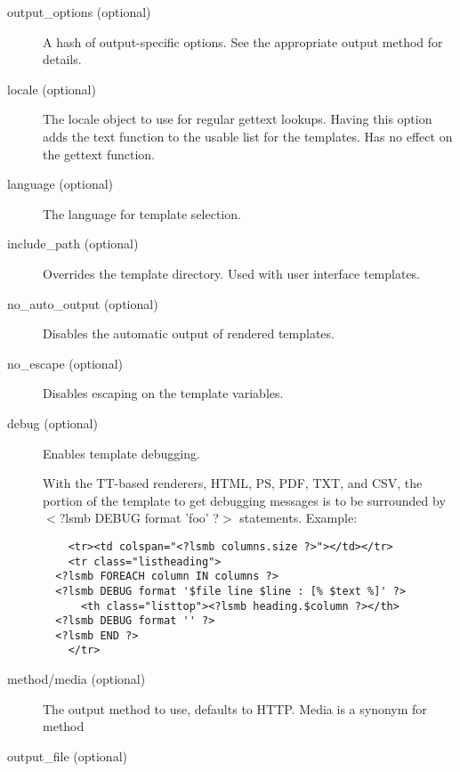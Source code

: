 \begin{description}
\begin{description}
\begin{description}
\begin{description}
\begin{description}
\begin{description}
\begin{description}
\begin{description}
\begin{description}
\begin{description}
\begin{description}
\begin{description}
\item[{output\_options (optional)}] \mbox{}

A hash of output-specific options.  See the appropriate output method for
details.


\item[{locale (optional)}] \mbox{}

The locale object to use for regular gettext lookups.  Having this option adds
the text function to the usable list for the templates.  Has no effect on the
gettext function.


\item[{language (optional)}] \mbox{}

The language for template selection.


\item[{include\_path (optional)}] \mbox{}

Overrides the template directory.  Used with user interface templates.


\item[{no\_auto\_output (optional)}] \mbox{}

Disables the automatic output of rendered templates.


\item[{no\_escape (optional)}] \mbox{}

Disables escaping on the template variables.


\item[{debug (optional)}] \mbox{}

Enables template debugging.



With the TT-based renderers, HTML, PS, PDF, TXT, and CSV, the portion of the
template to get debugging messages is to be surrounded by
$<$?lsmb DEBUG format 'foo' ?$>$ statements.  Example:

\begin{verbatim}
    <tr><td colspan="<?lsmb columns.size ?>"></td></tr>
    <tr class="listheading">
  <?lsmb FOREACH column IN columns ?>
  <?lsmb DEBUG format '$file line $line : [% $text %]' ?>
      <th class="listtop"><?lsmb heading.$column ?></th>
  <?lsmb DEBUG format '' ?>
  <?lsmb END ?>
    </tr>
\end{verbatim}

\item[{method/media (optional)}] \mbox{}

The output method to use, defaults to HTTP.  Media is a synonym for method


\item[{output\_file (optional)}] \mbox{}


\end{description}
\end{description}
\end{description}
\end{description}
\end{description}
\end{description}
\end{description}
\end{description}
\end{description}
\end{description}
\end{description}
\end{description}
